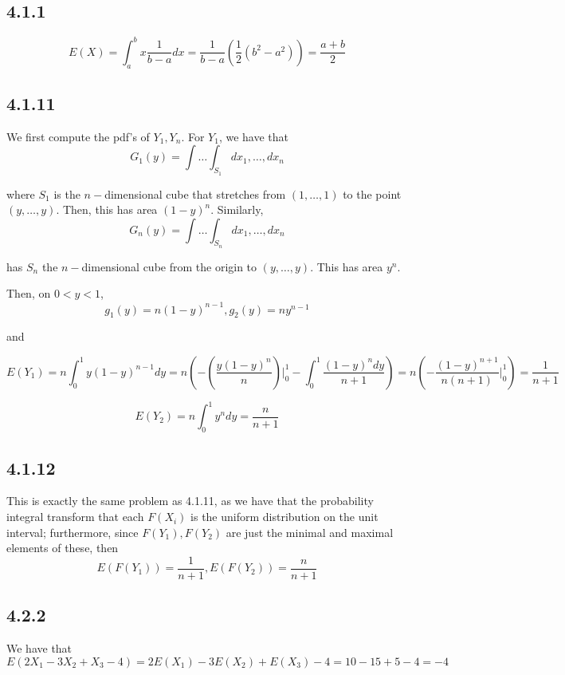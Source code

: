 \documentclass[12pt,letterpaper]{article}
\theoremstyle{definition}
\begin{document}
\subsection*{4.1.1}

\[
  E(X) = \int_a^bx\frac{1}{b-a}dx = \frac{1}{b-a}(\frac{1}{2}(b^2 - a^2)) = \frac{a+b}{2}
\]


\subsection*{4.1.11}

We first compute the pdf's of $Y_1, Y_n$. For $Y_1$, we have that
\[
  G_1(y) = \int \dots \int_{S_1} dx_1, \dots, dx_n
\]

where $S_1$ is the $n-$dimensional cube that stretches from $(1,\dots, 1)$ to the
point $(y, \dots, y)$. Then, this has area $(1-y)^n$. Similarly,
\[
  G_n(y) = \int \dots \int_{S_n} dx_1, \dots, dx_n
\]

has $S_n$ the $n-$dimensional cube from the origin to $(y, \dots, y)$. This has
area $y^n$.

Then, on $0 < y < 1$,
\[
  g_1(y) = n(1-y)^{n-1}, g_2(y) = ny^{n-1}
\]

and

\[
  E(Y_1) = n\int_0^1y(1-y)^{n-1}dy = n(-(\frac{y(1-y)^n}{n})\Big|_0^1 -
  \int_0^1\frac{(1-y)^ndy}{n+1}) = n(-\frac{(1-y)^{n+1}}{n(n+1)}\Big|_0^1) =
  \frac{1}{n+1}
\]

\[
  E(Y_2) = n\int_0^1y^ndy = \frac{n}{n+1}
\]

\subsection*{4.1.12}

This is exactly the same problem as 4.1.11, as we have that the probability
integral transform that each $F(X_i)$ is the uniform distribution on the unit
interval; furthermore,
since $F(Y_1), F(Y_2)$ are just the minimal and maximal
elements of these, then
\[
  E(F(Y_1)) = \frac{1}{n+1}, E(F(Y_2)) = \frac{n}{n+1}
\]

\subsection*{4.2.2}

We have that
\[
  E(2X_1 - 3X_2 + X_3 - 4) = 2E(X_1) - 3E(X_2) + E(X_3) - 4 = 10 -15 +5 - 4 = -4
\]
\end{document}

